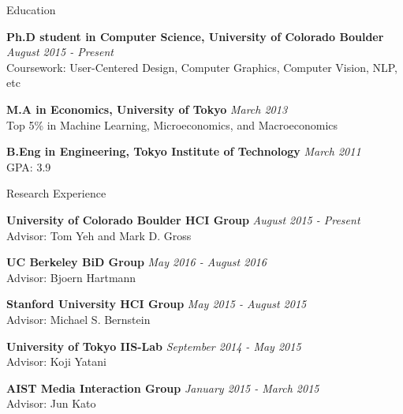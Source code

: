 \documentclass{resume} %
\begin{document}
\begin{rSection}{Education}

{\bf Ph.D student in Computer Science, University of Colorado Boulder} \hfill {\em August 2015 - Present} \\
Coursework: User-Centered Design, Computer Graphics, Computer Vision, NLP, etc

{\bf M.A in Economics, University of Tokyo} \hfill {\em March 2013} \\
Top 5\% in Machine Learning, Microeconomics, and Macroeconomics

{\bf B.Eng in Engineering, Tokyo Institute of Technology} \hfill {\em March 2011} \\ 
GPA: 3.9

\end{rSection}



\begin{rSection}{Research Experience}

{\bf University of Colorado Boulder HCI Group} \hfill {\em August 2015 - Present} \\
Advisor: Tom Yeh and Mark D. Gross

{\bf UC Berkeley BiD Group} \hfill {\em May 2016 - August 2016} \\
Advisor: Bjoern Hartmann

{\bf Stanford University HCI Group} \hfill {\em May 2015 - August 2015} \\
Advisor: Michael S. Bernstein

{\bf University of Tokyo IIS-Lab} \hfill {\em September 2014 - May 2015} \\
Advisor: Koji Yatani

{\bf AIST Media Interaction Group} \hfill {\em January 2015 - March 2015} \\
Advisor: Jun Kato

\end{rSection}
\end{document}

